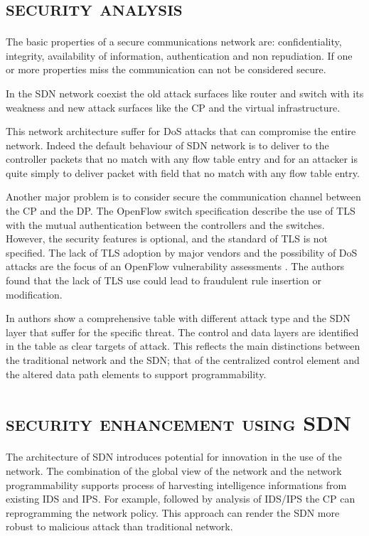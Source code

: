 %
\section*{\small \textsc{security analysis}}
The basic properties of a secure communications network are: confidentiality, integrity, availability of information, authentication and non repudiation. If one or more properties miss the communication can not be considered secure.

In the \ac{SDN} network coexist the old attack surfaces like router and switch with its weakness and new attack surfaces like the \ac{CP} and the virtual infrastructure.

This network architecture suffer for \ac{DoS} attacks that can compromise the entire network. Indeed the default behaviour of \ac{SDN} network is to deliver to the controller packets that no match with any flow table entry and for an attacker is quite simply to deliver packet with field that no match with any flow table entry.

Another major problem is to consider secure the communication channel between the 	\ac{CP} and the \ac{DP}. The OpenFlow switch specification \cite{onf:openflow-spec} describe the use of \ac{TLS} with the mutual authentication between the controllers and the switches. However, the security features is optional, and the standard of \ac{TLS} is not specified. The lack of \ac{TLS} adoption by major vendors and the possibility of \ac{DoS} attacks are the focus of an OpenFlow vulnerability assessments \cite{acm:openflow-vulnerability}. The authors found that the lack of \ac{TLS} use could lead to fraudulent rule insertion or modification.

In \cite{sdn-openflow-security} authors show a comprehensive table with different attack type and the \ac{SDN} layer that suffer for the specific threat. The control and data layers are identified in the table as clear targets of attack. This reflects the main distinctions between the traditional network and the \ac{SDN}; that of the centralized control element and the altered data path elements to support programmability.

\section*{\small \textsc{security enhancement using \ac{SDN}}}
The architecture of \ac{SDN} introduces potential for innovation in the use of the network. The combination of the global view of the network and the network programmability supports process of harvesting intelligence informations from existing \ac{IDS} and \ac{IPS}. For example, followed by analysis of \ac{IDS}/\ac{IPS} the \ac{CP} can reprogramming the network policy. This approach can render the \ac{SDN} more robust to malicious attack than traditional network.

